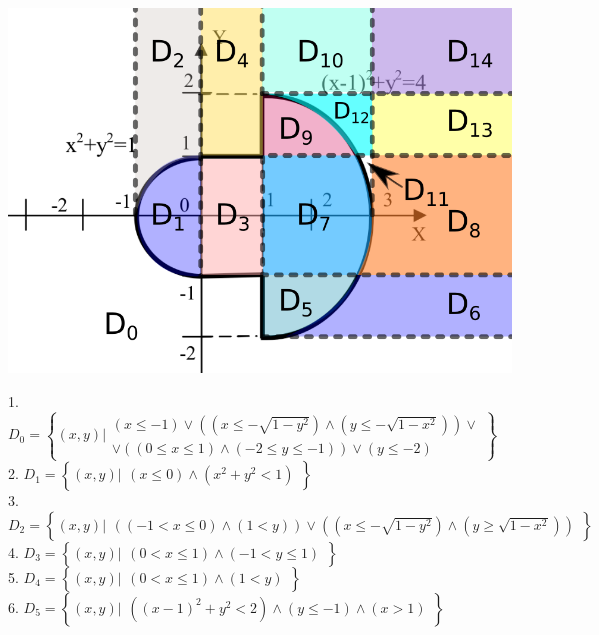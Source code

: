 \documentclass[14pt,a4paper]{scrartcl}
\theoremstyle{definition}
\theoremstyle{remark}
\theoremstyle{definition}
\theoremstyle{definition}
\begin{document}
\begin{center} \includegraphics[scale=0.35]{assets/fixobl0.png}
\end{center}
1. $D_0 = \left\lbrace (x,y) \Bigg| \begin{gathered}
 (x\leq -1)  \lor \left( (x \leq  -\sqrt{1 - y^2}) \land (y \leq  -\sqrt{1-x^2}) \right) \lor \\
 \lor \left( (0 \leq x \leq 1 )\land ( -2  \leq y \leq -1) \right) \lor (y \leq -2)
\end{gathered} \right\rbrace $\\
2. $D_1 = \left\lbrace (x,y) \big| \begin{gathered}
(x\leq 0) \land (x^2 + y^2 < 1)
\end{gathered} \right\rbrace $\\
3.  $D_2 = \left\lbrace (x,y) \big| \begin{gathered}
\left( (-1<x\leq 0) \land (1<y) \right)
\lor \left( (x \leq  -\sqrt{1 - y^2}) \land (y \geq   \sqrt{1-x^2}) \right)
\end{gathered} \right\rbrace $\\
4.  $D_3 = \left\lbrace (x,y) \big| \begin{gathered}
( 0 < x \leq 1) \land (-1 < y \leq 1)
\end{gathered} \right\rbrace $\\
5. $D_4 = \left\lbrace (x,y) \big| \begin{gathered}
( 0 < x \leq 1) \land (1 < y )
\end{gathered} \right\rbrace $\\
6. $D_5 = \left\lbrace (x,y) \big| \begin{gathered}
\left( (x-1)^2 + y^2 < 2 \right) \land ( y \leq -1 ) \land (x >1)
\end{gathered} \right\rbrace $\\
\end{document}
